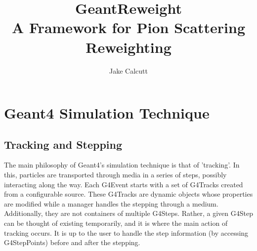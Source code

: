 \documentclass[12pt]{article}
\title{GeantReweight \\ 
   \large A Framework for Pion Scattering Reweighting}
\date{}
\begin{document}
\author[1]{Jake Calcutt}

\maketitle
\thispagestyle{fancy}

\section{Geant4 Simulation Technique}
\subsection{Tracking and Stepping}
The main philosophy of Geant4's simulation technique is that of 'tracking'. In this, particles are transported through media in a series of steps, possibly interacting along the way. Each G4Event starts with a set of G4Tracks created from a configurable source. These G4Tracks are dynamic objects whose properties are modified while a manager handles the stepping through a medium. Additionally, they are not containers of multiple G4Steps. Rather, a given G4Step can be thought of existing temporarily, and it is where the main action of tracking occurs. It is up to the user to handle the step information (by accessing G4StepPoints) before and after the stepping. 
\end{document}

